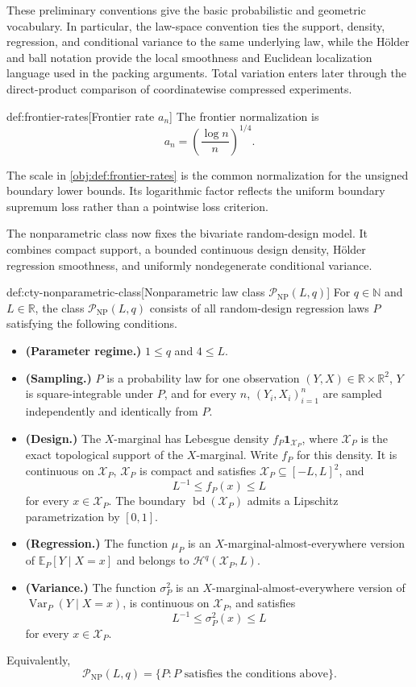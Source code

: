 \documentclass[11pt]{article}
\begin{document}
These preliminary conventions give the basic probabilistic and geometric vocabulary. In particular, the law-space convention ties the support, density, regression, and conditional variance to the same underlying law, while the Hölder and ball notation provide the local smoothness and Euclidean localization language used in the packing arguments. Total variation enters later through the direct-product comparison of coordinatewise compressed experiments.

\begin{definitionv}{def:frontier-rates}[Frontier rate $a_n$]
The frontier normalization is
\[
a_n=\left(\frac{\log n}{n}\right)^{1/4}.
\]
\end{definitionv}

The scale in \cref{obj:def:frontier-rates} is the common normalization for the unsigned boundary lower bounds. Its logarithmic factor reflects the uniform boundary supremum loss rather than a pointwise loss criterion.

The nonparametric class now fixes the bivariate random-design model. It combines compact support, a bounded continuous design density, Hölder regression smoothness, and uniformly nondegenerate conditional variance.

\begin{definitionv}{def:cty-nonparametric-class}[Nonparametric law class $\mathcal P_{\mathrm{NP}}(L,q)$]
For \(q\in\mathbb N\) and \(L\in\mathbb R\), the class \(\mathcal P_{\mathrm{NP}}(L,q)\) consists of all random-design regression laws \(P\) satisfying the following conditions.
\begin{itemize}
\item \textbf{(Parameter regime.)} \(1\leq q\) and \(4\leq L\).
\item \textbf{(Sampling.)} \(P\) is a probability law for one observation \((Y,X)\in\mathbb R\times\mathbb R^2\), \(Y\) is square-integrable under \(P\), and for every \(n\), \((Y_i,X_i)_{i=1}^n\) are sampled independently and identically from \(P\).
\item \textbf{(Design.)} The \(X\)-marginal has Lebesgue density \(f_P\mathbf 1_{\mathcal X_P}\), where \(\mathcal X_P\) is the exact topological support of the \(X\)-marginal. Write \(f_P\) for this density. It is continuous on \(\mathcal X_P\), \(\mathcal X_P\) is compact and satisfies \(\mathcal X_P\subseteq[-L,L]^2\), and
\[
L^{-1}\leq f_P(x)\leq L
\]
for every \(x\in\mathcal X_P\). The boundary \(\operatorname{bd}(\mathcal X_P)\) admits a Lipschitz parametrization by \([0,1]\).
\item \textbf{(Regression.)} The function \(\mu_P\) is an \(X\)-marginal-almost-everywhere version of \(\mathbb E_P[Y\mid X=x]\) and belongs to \(\mathcal H^q(\mathcal X_P,L)\).
\item \textbf{(Variance.)} The function \(\sigma_P^2\) is an \(X\)-marginal-almost-everywhere version of \(\operatorname{Var}_P(Y\mid X=x)\), is continuous on \(\mathcal X_P\), and satisfies
\[
L^{-1}\leq \sigma_P^2(x)\leq L
\]
for every \(x\in\mathcal X_P\).
\end{itemize}
Equivalently,
\[
\mathcal P_{\mathrm{NP}}(L,q)
=
\{P:\text{\(P\) satisfies the conditions above}\}.
\]
\end{definitionv}
\end{document}
